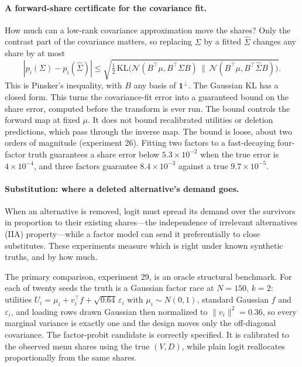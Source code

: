 \documentclass[12pt]{article}
\theoremstyle{remark}
\begin{document}
\paragraph{A forward-share certificate for the covariance fit.} How much can a low-rank
covariance approximation move the shares? Only the contrast part of the
covariance matters, so replacing $\Sigma$ by a fitted $\hat\Sigma$
changes any share by at most
\[
|p_i(\Sigma) - p_i(\hat\Sigma)| \le
\sqrt{\tfrac12\,\mathrm{KL}\big(\mathcal{N}(B^\top\mu, B^\top\Sigma B)\,\|\,
\mathcal{N}(B^\top\mu, B^\top\hat\Sigma B)\big)}.
\]
This is Pinsker's inequality, with $B$ any basis of $\mathbf{1}^\perp$.
The Gaussian KL has a closed form. This turns the covariance-fit error into a
guaranteed bound on the share error, computed before the transform is
ever run. The bound controls the forward map at fixed $\mu$. It does
not bound recalibrated utilities or deletion predictions, which pass
through the inverse map. The bound is loose, about two orders of magnitude (experiment 26).
Fitting two factors to a fast-decaying four-factor truth guarantees a
share error below $5.3\times10^{-2}$ when the true error is
$4\times10^{-4}$, and three factors guarantee $8.4\times10^{-3}$
against a true $9.7\times10^{-5}$.

\paragraph{Substitution: where a deleted alternative's demand goes.}
When an alternative is removed, logit must spread its demand over the
survivors in proportion to their existing shares---the independence of
irrelevant alternatives (IIA) property---while
a factor model can send it preferentially to close substitutes. These
experiments measure which is right under known synthetic truths, and by
how much.

The primary comparison, experiment 29, is an oracle structural
benchmark. For each of twenty seeds the truth is a Gaussian factor race
at $N = 150$, $k = 2$: utilities $U_i = \mu_i + v_i^\top f +
\sqrt{0.64}\,\varepsilon_i$ with $\mu_i \sim N(0,1)$, standard
Gaussian $f$ and $\varepsilon_i$, and loading rows drawn Gaussian then
normalized to $\|v_i\|^2 = 0.36$, so every marginal variance is
exactly one and the design moves only the off-diagonal covariance. The
factor-probit candidate is correctly specified. It is calibrated to the
observed menu shares using the true $(V, D)$, while plain logit
reallocates proportionally from the same shares.
\end{document}
